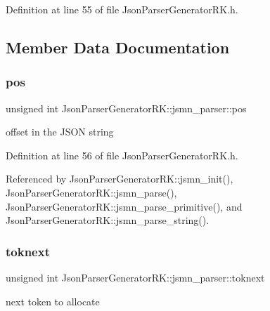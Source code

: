 Definition at line 55 of file Json\+Parser\+Generator\+R\+K.\+h.



\subsection{Member Data Documentation}
\mbox{\label{struct_json_parser_generator_r_k_1_1jsmn__parser_a7e1b077e5e56c0a1c6e8ec441963c0db}} 
\subsubsection{\texorpdfstring{pos}{pos}}
{\footnotesize\ttfamily unsigned int Json\+Parser\+Generator\+R\+K\+::jsmn\+\_\+parser\+::pos}



offset in the J\+S\+ON string 



Definition at line 56 of file Json\+Parser\+Generator\+R\+K.\+h.



Referenced by Json\+Parser\+Generator\+R\+K\+::jsmn\+\_\+init(), Json\+Parser\+Generator\+R\+K\+::jsmn\+\_\+parse(), Json\+Parser\+Generator\+R\+K\+::jsmn\+\_\+parse\+\_\+primitive(), and Json\+Parser\+Generator\+R\+K\+::jsmn\+\_\+parse\+\_\+string().

\mbox{\label{struct_json_parser_generator_r_k_1_1jsmn__parser_ac3b38630c87a1ede05cc8b84c78ff9e9}} 
\subsubsection{\texorpdfstring{toknext}{toknext}}
{\footnotesize\ttfamily unsigned int Json\+Parser\+Generator\+R\+K\+::jsmn\+\_\+parser\+::toknext}



next token to allocate 



